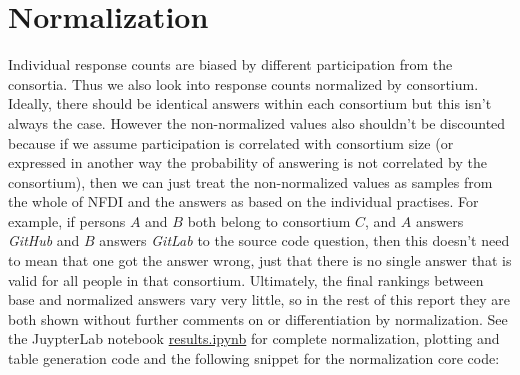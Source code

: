 \documentclass[headsepline,titlepage,twoside,12pt,toc=flat,headings=normal]{scrreprt}
\begin{document}
\newpage
\section{Normalization}
Individual response counts are biased by different participation from the consortia.
Thus we also look into response counts normalized by consortium.
Ideally, there should be identical answers within each consortium but this isn't always the case.
However the non-normalized values also shouldn't be discounted because if we assume participation is correlated with consortium size (or expressed in another way the probability of answering is not correlated by the consortium), then we can just treat the non-normalized values as samples from the whole of NFDI and the answers as based on the individual practises.
For example, if persons $A$ and $B$ both belong to consortium $C$, and $A$ answers \emph{GitHub} and $B$ answers \emph{GitLab} to the source code question, then this doesn't need to mean that one got the answer wrong, just that there is no single answer that is valid for all people in that consortium.
Ultimately, the final rankings between base and normalized answers vary very little, so in the rest of this report they are both shown without further comments on or differentiation by normalization.
See the JuypterLab notebook \href{https://github.com/KonradHoeffner/softwaresurvey/blob/master/results.ipynb}{results.ipynb} for complete normalization, plotting and table generation code and the following snippet for the normalization core code:
\iffalse
\begin{lstlisting}
# if someone has n consortia, count only as 1/n for normalization
# of other cols, requires col_count("consortium","...") first
def cons_count_normalize():
  counts = defaultdict(int)
  for consortia in df["consortium"]:
    for consortium in consortia:
      counts[consortium] += len(consortia)
  return counts
\end{lstlisting}
\fi
\end{document}

